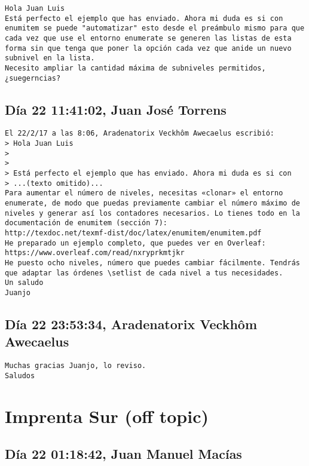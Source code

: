 \documentclass[a4paper,10pt]{article}
\begin{document}
\begin{lstlisting}
Hola Juan Luis
Está perfecto el ejemplo que has enviado. Ahora mi duda es si con
enumitem se puede "automatizar" esto desde el preámbulo mismo para que
cada vez que use el entorno enumerate se generen las listas de esta
forma sin que tenga que poner la opción cada vez que anide un nuevo
subnivel en la lista.
Necesito ampliar la cantidad máxima de subniveles permitidos, ¿suegerncias?

\end{lstlisting}

\subsection{Día 22 11:41:02, Juan José Torrens}

\begin{lstlisting}
El 22/2/17 a las 8:06, Aradenatorix Veckhôm Awecaelus escribió:
> Hola Juan Luis
>
>
> Está perfecto el ejemplo que has enviado. Ahora mi duda es si con
> ...(texto omitido)...
Para aumentar el número de niveles, necesitas «clonar» el entorno 
enumerate, de modo que puedas previamente cambiar el número máximo de 
niveles y generar así los contadores necesarios. Lo tienes todo en la 
documentación de enumitem (sección 7): 
http://texdoc.net/texmf-dist/doc/latex/enumitem/enumitem.pdf
He preparado un ejemplo completo, que puedes ver en Overleaf: 
https://www.overleaf.com/read/nxryprkmtjkr
He puesto ocho niveles, número que puedes cambiar fácilmente. Tendrás 
que adaptar las órdenes \setlist de cada nivel a tus necesidades.
Un saludo
Juanjo

\end{lstlisting}

\subsection{Día 22 23:53:34, Aradenatorix Veckhôm Awecaelus}

\begin{lstlisting}
Muchas gracias Juanjo, lo reviso.
Saludos

\end{lstlisting}
\section{Imprenta Sur (off topic)}

\subsection{Día 22 01:18:42, Juan Manuel Macías}
\end{document}
